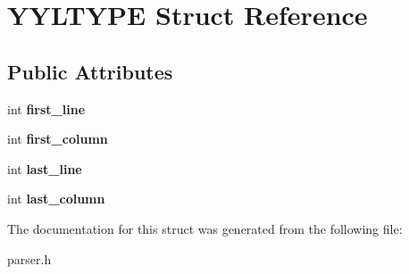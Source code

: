 \hypertarget{structYYLTYPE}{}\section{Y\+Y\+L\+T\+Y\+PE Struct Reference}
\label{structYYLTYPE}
\subsection*{Public Attributes}
\begin{DoxyCompactItemize}
\item 
\mbox{\label{structYYLTYPE_a50ad3435eaea74bcab6f1ae5fbaefd89}} 
int {\bfseries first\+\_\+line}
\item 
\mbox{\label{structYYLTYPE_a3a556533babab1b9066fa9bdbb809210}} 
int {\bfseries first\+\_\+column}
\item 
\mbox{\label{structYYLTYPE_a3075f2bc3448df5d2a9f16d22bff2cc1}} 
int {\bfseries last\+\_\+line}
\item 
\mbox{\label{structYYLTYPE_acf87f8c98686f286eaf700c4b62157b2}} 
int {\bfseries last\+\_\+column}
\end{DoxyCompactItemize}


The documentation for this struct was generated from the following file\+:\begin{DoxyCompactItemize}
\item 
parser.\+h\end{DoxyCompactItemize}
